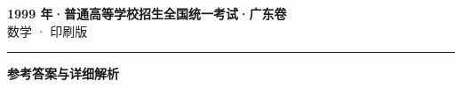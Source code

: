 \documentclass[zihao=5, a4paper]{ctexart}
\begin{document}
\begin{center}
  {\Large\bfseries 1999 年·普通高等学校招生全国统一考试·广东卷}\\[4pt]
  {\large 数学 · 印刷版}
\end{center}
\medskip
{}

\par\bigskip\hrule\bigskip
{}
\begin{center}{\large\bfseries 参考答案与详细解析}\end{center}
\smallskip

\end{document}

